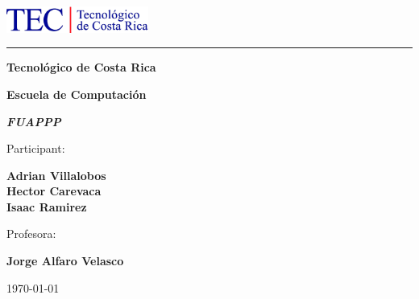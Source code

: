 \begin{titlepage}
    \begin{center}
    \includegraphics[width=0.35\textwidth]{TEC.jpg}\hspace{0.2in}
    \rule[1.2cm]{\textwidth}{3pt}
    \vspace{-1cm}
    {\Huge
    \textbf{Tecnológico de Costa Rica}\vspace*{0.5cm}
	}
    
    \huge
    \textbf{Escuela de Computación}\vspace*{1cm}
        
        {\LARGE   
        \textbf{\textit{FUAPPP}}
        }
        \vspace*{1.5cm}
        

		{\Large
		 Participant:    
	
			\textbf{Adrian Villalobos}\\
			\textbf{Hector Carevaca}\\
			\textbf{Isaac Ramirez}\\
		}

        
         \vspace*{1.1cm}
         {\Large
        	Profesora:
        
    		\textbf{Jorge Alfaro Velasco}\\
		}

    \vfill
    {\Large \today}
    
    
    
    \end{center}
\end{titlepage}
